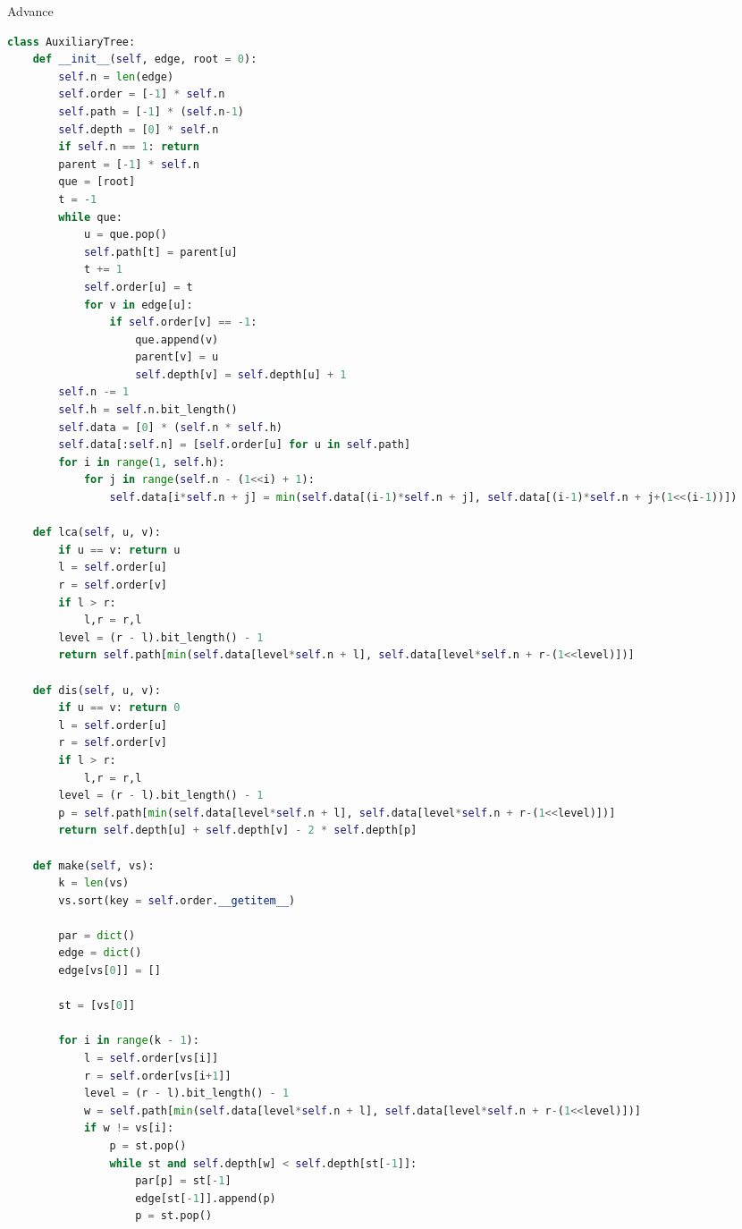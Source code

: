 \documentclass[10pt,landscape, a4paper]{article}
\begin{document}
\begin{multicols*}{3}
Advance
\begin{lstlisting}[language=Python]
class AuxiliaryTree:
    def __init__(self, edge, root = 0):
        self.n = len(edge)
        self.order = [-1] * self.n
        self.path = [-1] * (self.n-1)
        self.depth = [0] * self.n
        if self.n == 1: return
        parent = [-1] * self.n
        que = [root]
        t = -1
        while que:
            u = que.pop()
            self.path[t] = parent[u]
            t += 1
            self.order[u] = t
            for v in edge[u]:
                if self.order[v] == -1:
                    que.append(v)
                    parent[v] = u
                    self.depth[v] = self.depth[u] + 1
        self.n -= 1
        self.h = self.n.bit_length()
        self.data = [0] * (self.n * self.h)
        self.data[:self.n] = [self.order[u] for u in self.path]
        for i in range(1, self.h):
            for j in range(self.n - (1<<i) + 1):
                self.data[i*self.n + j] = min(self.data[(i-1)*self.n + j], self.data[(i-1)*self.n + j+(1<<(i-1))])

    def lca(self, u, v):
        if u == v: return u
        l = self.order[u]
        r = self.order[v]
        if l > r:
            l,r = r,l
        level = (r - l).bit_length() - 1
        return self.path[min(self.data[level*self.n + l], self.data[level*self.n + r-(1<<level)])]

    def dis(self, u, v):
        if u == v: return 0
        l = self.order[u]
        r = self.order[v]
        if l > r:
            l,r = r,l
        level = (r - l).bit_length() - 1
        p = self.path[min(self.data[level*self.n + l], self.data[level*self.n + r-(1<<level)])]
        return self.depth[u] + self.depth[v] - 2 * self.depth[p]

    def make(self, vs):
        k = len(vs)
        vs.sort(key = self.order.__getitem__)

        par = dict()
        edge = dict()
        edge[vs[0]] = []

        st = [vs[0]]

        for i in range(k - 1):
            l = self.order[vs[i]]
            r = self.order[vs[i+1]]
            level = (r - l).bit_length() - 1
            w = self.path[min(self.data[level*self.n + l], self.data[level*self.n + r-(1<<level)])]
            if w != vs[i]:
                p = st.pop()
                while st and self.depth[w] < self.depth[st[-1]]:
                    par[p] = st[-1]
                    edge[st[-1]].append(p)
                    p = st.pop()


\end{lstlisting}
\end{multicols*}
\end{document}
